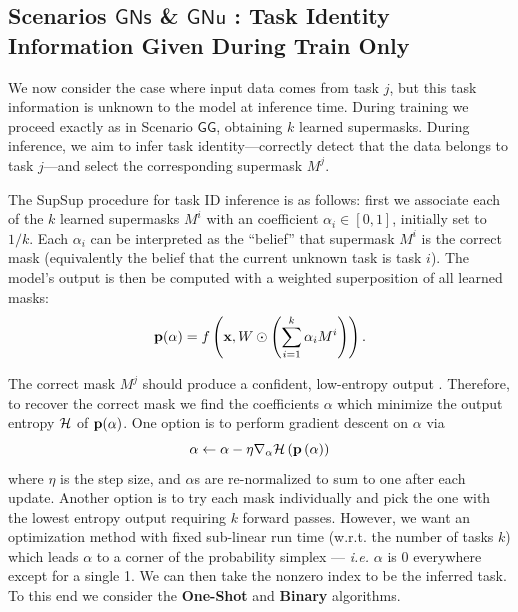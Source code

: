 \documentclass{article}
\newcommand{\ac}{SupSup\xspace}
\newcommand{\casename}[1]{\ensuremath{\mathsf{#1}}\xspace}
\begin{document}
\subsection{Scenarios \casename{GNs} \& \casename{GNu} : Task Identity Information Given During Train Only} \label{sec:S23}
We now consider the case where input data comes from task $j$, but this task information is unknown to the model at inference time. During training we proceed exactly as in Scenario \casename{GG}, obtaining $k$ learned supermasks. During inference, we aim to infer task identity---correctly detect that the data belongs to task $j$---and select the corresponding supermask $M^j$. 

The \ac procedure for task ID inference is as follows: first we associate each of the $k$ learned supermasks $M^i$ with an coefficient $\alpha_i \in [0,1]$, initially set to $1/k$. Each $\alpha_i$ can be interpreted as the ``belief'' that supermask $M^i$ is the correct mask (equivalently the belief that the current unknown task is task $i$). The model's output is then be computed with a weighted superposition of all learned masks: 
\begin{equation} \label{eq:sup}
    \mathbf{p}(\alpha) = f\left( \mathbf{x}, W \odot \left(  \sum_{i=1}^k \alpha_i M^i \right) \right).
\end{equation}


\hspace{-.5em}The correct mask $M^j$ should produce a confident, low-entropy output \cite{hendrycks2016baseline}. Therefore, to recover the correct mask we find the coefficients $\alpha$ which minimize the output entropy $\mathcal{H}$ of $\mathbf{p}(\alpha)$. One option is to perform gradient descent on $\alpha$ via 
\begin{equation}\alpha \gets \alpha - \eta \nabla_\alpha \mathcal{H}\left( \mathbf{p} \left( \alpha \right) \right)
\end{equation}
where $\eta$ is the step size, and $\alpha$s are re-normalized to sum to one after each update. Another option is to try each mask individually and pick the one with the lowest entropy output requiring $k$ forward passes. However, we want an optimization method with fixed sub-linear run time (w.r.t. the number of tasks $k$) which leads $\alpha$ to a corner of the probability simplex --- \textit{i.e.} $\alpha$ is 0 everywhere except for a single 1. We can then take the nonzero index to be the inferred task. To this end we consider the \textbf{One-Shot} and \textbf{Binary} algorithms.
\end{document}
